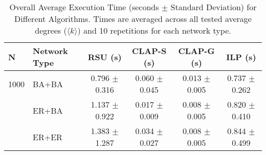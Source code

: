 \begin{table}[htbp]
\centering
\caption{Overall Average Execution Time (seconds $\pm$ Standard Deviation) for Different Algorithms. Times are averaged across all tested average degrees ($\langle k \rangle$) and 10 repetitions for each network type.}
\label{tab:execution_time_overall}
\begin{tabular}{l l c c c c}
\toprule
N & Network Type & RSU (s) & CLAP-S (s) & CLAP-G (s) & ILP (s) \\
\midrule
1000 & BA+BA & 0.796 $\pm$ 0.316 & 0.060 $\pm$ 0.045 & 0.013 $\pm$ 0.005 & 0.737 $\pm$ 0.262 \\
 & ER+BA & 1.137 $\pm$ 0.922 & 0.017 $\pm$ 0.009 & 0.008 $\pm$ 0.005 & 0.820 $\pm$ 0.410 \\
 & ER+ER & 1.383 $\pm$ 1.287 & 0.034 $\pm$ 0.027 & 0.008 $\pm$ 0.005 & 0.844 $\pm$ 0.499 \\
\bottomrule
\end{tabular}%
\end{table}
